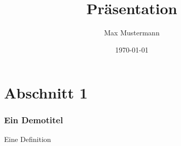 \documentclass{beamer}
\title{Präsentation}
\author{Max Mustermann}
\date{\today}
\begin{document}
\maketitle
\frame{\tableofcontents[currentsection]}
 
\section{Abschnitt 1}
\begin{frame} %
	\frametitle{Ein Demotitel} %
	\begin{Definition} %
		Eine Definition
	\end{Definition}
\end{frame}
\end{document}
